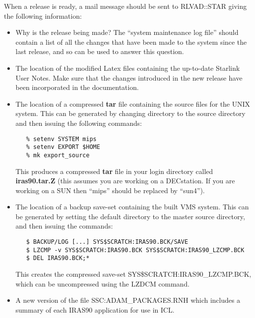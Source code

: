 When a release is ready, a mail message should be sent to RLVAD::STAR giving the 
following information:

\begin{itemize}
\item Why is the release being made? The ``system maintenance log file'' should 
contain a list of all the changes that have been made to the system since the 
last release, and so can be used to answer this question.
\item The location of the modified Latex files containing the up-to-date 
Starlink User Notes. Make sure that the changes introduced in the new release 
have been incorporated in the documentation.
\item The location of a compressed {\bf tar} file containing the source files
for the {\small UNIX} system. This can be generated by changing directory to the
source directory and then issuing the following commands: 

\small
\begin{verbatim}
   % setenv SYSTEM mips
   % setenv EXPORT $HOME
   % mk export_source
\end{verbatim}
\normalsize

This produces a compressed {\bf tar} file in your login directory called
{\bf iras90.tar.Z} (this assumes you are working on a DECstation. If you are
working on a {\small SUN} then ``mips'' should be replaced by ``sun4'').
\item The location of a backup save-set containing the built {\small VMS} 
system. This can be generated by setting the default directory to the master 
source directory, and then issuing the commands:

\small
\begin{verbatim}
   $ BACKUP/LOG [...] SYS$SCRATCH:IRAS90.BCK/SAVE
   $ LZCMP -v SYS$SCRATCH:IRAS90.BCK SYS$SCRATCH:IRAS90_LZCMP.BCK
   $ DEL IRAS90.BCK;*
\end{verbatim}

This creates the compressed save-set {\small SYS\$SCRATCH:IRAS90\_LZCMP.BCK},
which can be uncompressed using the {\small LZDCM} command. 
\item A new version of the file {\small SSC:ADAM\_PACKAGES.RNH} which includes a
summary of each {\small IRAS90} application for use in {\small ICL}.
\end{itemize}



